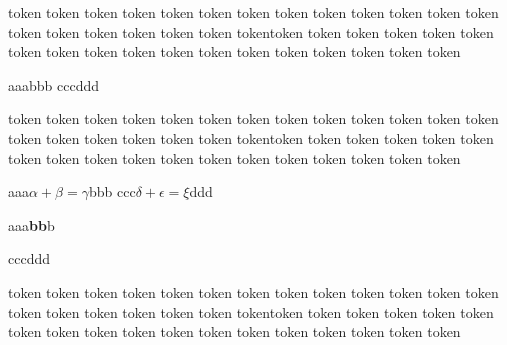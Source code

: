 \documentclass[12pt]{article}
\begin{document}
token token token token token token token token token token token token token token token token token token token tokentoken token token token token token token token token token token token token token token token token token

\begin{codeshow}
aaabbb
cccddd
\end{codeshow}

token token token token token token token token token token token token token token token token token token token tokentoken token token token token token token token token token token token token token token token token token

\begin{codeshow}
aaa$\alpha+\beta=\gamma$bbb
ccc$\delta+\epsilon=\xi$ddd
\end{codeshow}

\begin{codeshow}
aaa\textbf{bb}b

cccddd
\end{codeshow}

token token token token token token token token token token token token token token token token token token token tokentoken token token token token token token token token token token token token token token token token token
\end{document}
